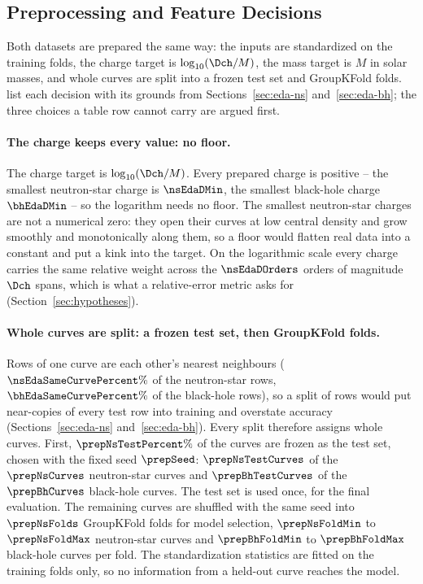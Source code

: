 \subsection{Preprocessing and Feature Decisions}
\label{sec:preprocessing}

Both datasets are prepared the same way: the inputs are standardized on the training folds, the charge target is $\log_{10}(\Dch/M)$, the mass target is $M$ in solar masses, and whole curves are split into a frozen test set and GroupKFold folds.  list each decision with its grounds from Sections~\ref{sec:eda-ns} and~\ref{sec:eda-bh}; the three choices a table row cannot carry are argued first.

\paragraph{The charge keeps every value: no floor.}
The charge target is $\log_{10}(\Dch/M)$. Every prepared charge is positive -- the smallest neutron-star charge is $\nsEdaDMin$, the smallest black-hole charge $\bhEdaDMin$ -- so the logarithm needs no floor. The smallest neutron-star charges are not a numerical zero: they open their curves at low central density and grow smoothly and monotonically along them, so a floor would flatten real data into a constant and put a kink into the target. On the logarithmic scale every charge carries the same relative weight across the $\nsEdaDOrders$ orders of magnitude $\Dch$ spans, which is what a relative-error metric asks for (Section~\ref{sec:hypotheses}).

\paragraph{Whole curves are split: a frozen test set, then GroupKFold folds.}
Rows of one curve are each other's nearest neighbours ($\nsEdaSameCurvePercent\%$ of the neutron-star rows, $\bhEdaSameCurvePercent\%$ of the black-hole rows), so a split of rows would put near-copies of every test row into training and overstate accuracy (Sections~\ref{sec:eda-ns} and~\ref{sec:eda-bh}). Every split therefore assigns whole curves. First, $\prepNsTestPercent\%$ of the curves are frozen as the test set, chosen with the fixed seed $\prepSeed$: $\prepNsTestCurves$ of the $\prepNsCurves$ neutron-star curves and $\prepBhTestCurves$ of the $\prepBhCurves$ black-hole curves. The test set is used once, for the final evaluation. The remaining curves are shuffled with the same seed into $\prepNsFolds$ GroupKFold folds for model selection, $\prepNsFoldMin$ to $\prepNsFoldMax$ neutron-star curves and $\prepBhFoldMin$ to $\prepBhFoldMax$ black-hole curves per fold. The standardization statistics are fitted on the training folds only, so no information from a held-out curve reaches the model.


